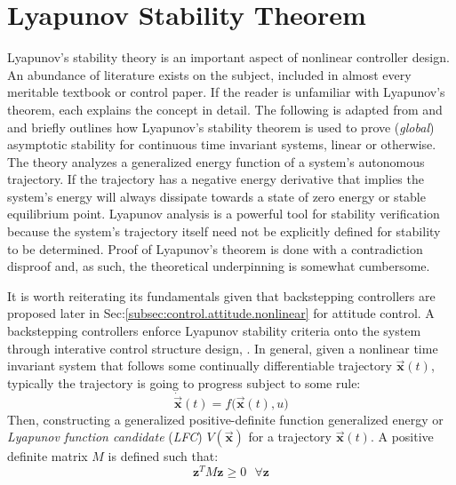 \section{Lyapunov Stability Theorem}
\label{sec:control.lyapunov}
Lyapunov's stability theory is an important aspect of nonlinear controller design. An abundance of literature exists on the subject, included in almost every meritable textbook or control paper. If the reader is unfamiliar with Lyapunov's theorem,  \cite{noteonlyapunov,nonlinearsystems,bojelayupanov} each explains the concept in detail. The following is adapted from \cite{bojelayupanov} and \cite{lyapunovstabilitytheorem} and briefly outlines how Lyapunov's stability theorem is used to prove (\emph{global}) asymptotic stability for continuous time invariant systems, linear or otherwise. The theory analyzes a generalized energy function of a system's autonomous trajectory. If the trajectory has a negative energy derivative that implies the system's energy will always dissipate towards a state of zero energy or stable equilibrium point. Lyapunov analysis is a powerful tool for stability verification because the system's trajectory itself need not be explicitly defined for stability to be determined. Proof of Lyapunov's theorem is done with a contradiction disproof and, as such, the theoretical underpinning is somewhat cumbersome.
\par
It is worth reiterating its fundamentals given that backstepping controllers are proposed later in Sec:\ref{subsec:control.attitude.nonlinear} for attitude control. A backstepping controllers enforce Lyapunov stability criteria onto the system through interative control structure design, \cite{backstepping,adaptivebackstep,intelligentbackstep}. In general, given a nonlinear time invariant system that follows some continually differentiable trajectory $\vec{\mathbf{x}}(t)$, typically the trajectory is going to progress subject to some rule:
\begin{equation}\label{eq:4.17}
\dot{\vec{\mathbf{x}}}(t)=f\big(\vec{\mathbf{x}}(t),u\big)
\end{equation}
Then, constructing a generalized positive-definite function generalized energy or \emph{Lyapunov function candidate} (\emph{LFC}) $V(\vec{\mathbf{x}})$ for a trajectory $\vec{\mathbf{x}}(t)$. A positive definite matrix $M$ is defined such that:
\begin{equation}
\mathbf{z}^TM\mathbf{z}\geq 0~~~\forall \mathbf{z}
\end{equation}
